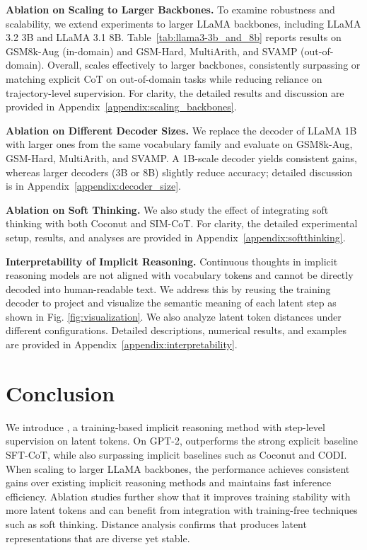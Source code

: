\noindent \textbf{Ablation on Scaling to Larger Backbones.}  
To examine robustness and scalability, we extend experiments to larger LLaMA backbones, including LLaMA 3.2 3B and LLaMA 3.1 8B.  
Table~\ref{tab:llama3-3b_and_8b} reports results on GSM8k-Aug (in-domain) and GSM-Hard, MultiArith, and SVAMP (out-of-domain).  
Overall, \methodname scales effectively to larger backbones, consistently surpassing or matching explicit CoT on out-of-domain tasks while reducing reliance on trajectory-level supervision.  
For clarity, the detailed results and discussion are provided in Appendix~\ref{appendix:scaling_backbones}.

\noindent \textbf{Ablation on Different Decoder Sizes.}  
We replace the decoder of LLaMA 1B with larger ones from the same vocabulary family and evaluate on GSM8k-Aug, GSM-Hard, MultiArith, and SVAMP. A 1B-scale decoder yields consistent gains, whereas larger decoders (3B or 8B) slightly reduce accuracy; detailed discussion is in Appendix~\ref{appendix:decoder_size}.

\noindent \textbf{Ablation on Soft Thinking.} 
We also study the effect of integrating soft thinking \citep{zhang2025soft, wu2025llms} with both Coconut and SIM-CoT. 
For clarity, the detailed experimental setup, results, and analyses are provided in Appendix~\ref{appendix:softthinking}.




\noindent \textbf{Interpretability of Implicit Reasoning.} 
Continuous thoughts in implicit reasoning models are not aligned with vocabulary tokens and cannot be directly decoded into human-readable text. 
We address this by reusing the training decoder to project and visualize the semantic meaning of each latent step as shown in Fig. \ref{fig:visualization}. 
We also analyze latent token distances under different configurations. 
Detailed descriptions, numerical results, and examples are provided in Appendix~\ref{appendix:interpretability}.

\section{Conclusion}
We introduce \methodname, a training-based implicit reasoning method with step-level supervision on latent tokens. On GPT-2, \methodname outperforms the strong explicit baseline SFT-CoT, while also surpassing implicit baselines such as Coconut and CODI. When scaling to larger LLaMA backbones, the performance achieves consistent gains over existing implicit reasoning methods and maintains fast inference efficiency. Ablation studies further show that it improves training stability with more latent tokens and can benefit from integration with training-free techniques such as soft thinking. Distance analysis confirms that \methodname produces latent representations that are diverse yet stable. 


